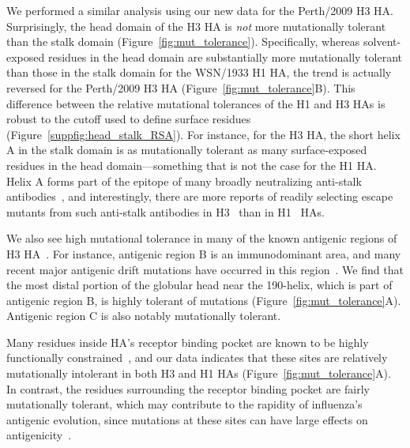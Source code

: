 \documentclass[9pt,twocolumn,twoside]{pnas-new-for-biorxiv}
\begin{document}
We performed a similar analysis using our new data for the Perth/2009 H3 HA.
Surprisingly, the head domain of the H3 HA is \emph{not} more mutationally tolerant than the stalk domain (Figure~\ref{fig:mut_tolerance}).
Specifically, whereas solvent-exposed residues in the head domain are substantially more mutationally tolerant than those in the stalk domain for the WSN/1933 H1 HA, the trend is actually reversed for the Perth/2009 H3 HA (Figure~\ref{fig:mut_tolerance}B).
This difference between the relative mutational tolerances of the H1 and H3 HAs is robust to the cutoff used to define surface residues (Figure~\ref{suppfig:head_stalk_RSA}).
For instance, for the H3 HA, the short helix A in the stalk domain is as mutationally tolerant as many surface-exposed residues in the head domain---something that is not the case for the H1 HA.
Helix A forms part of the epitope of many broadly neutralizing anti-stalk antibodies~\cite{mallajosyula2014influenza,laursen2013broadly,chai2016two}, and interestingly, there are more reports of readily selecting escape mutants from such anti-stalk antibodies in H3~\cite{ekiert2011highly, friesen2014common, chai2016two, yamayoshi2017human} than in H1~\cite{okuno1993common,doud2018quantifying,anderson2017natural} HAs.

We also see high mutational tolerance in many of the known antigenic regions of H3 HA~\cite{wiley1981structural}.
For instance, antigenic region B is an immunodominant area, and many recent major antigenic drift mutations have occurred in this region~\cite{chambers2015identification,koel2013substitutions,popova2012immunodominance}.
We find that the most distal portion of the globular head near the 190-helix, which is part of antigenic region B, is highly tolerant of mutations (Figure~\ref{fig:mut_tolerance}A).
Antigenic region C is also notably mutationally tolerant.

Many residues inside HA's receptor binding pocket are known to be highly functionally constrained~\cite{wilson1981structure,martin1998studies}, and our data indicates that these sites are relatively mutationally intolerant in both H3 and H1 HAs (Figure~\ref{fig:mut_tolerance}A).
In contrast, the residues surrounding the receptor binding pocket are fairly mutationally tolerant, which may contribute to the rapidity of influenza's antigenic evolution, since mutations at these sites can have large effects on antigenicity~\cite{wiley1981structural,koel2013substitutions}.
\end{document}
